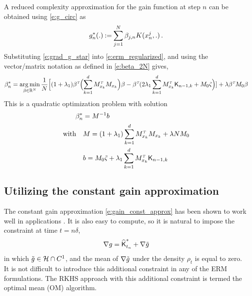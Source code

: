 A reduced complexity approximation for the gain function at step $n$ can be obtained using \eqref{e:g_circ} as
\begin{equation}
g^*_n(.)  \mathbin{:=} \sum_{j=1}^N \beta_{j,n} K(x^j_n, . ) \, .
\end{equation}
Substituting \eqref{e:grad_g_star} into \eqref{e:erm_regularized}, and using the vector/matrix notation as defined in \eqref{e:beta_2N} gives,
\begin{equation}
\beta ^*_n =
\mathop{\rm arg{\,}min}_{\beta  \in \mathbb{R}^N}  \frac{1}{N} \Bigl[ (1 + \lambda_1) \beta ^{\hbox{\tiny\it T}} \Bigl( \sum_{k=1}^d M_{x_k}^{\hbox{\tiny\it T}} M_{x_k} \Bigr) \beta  -  \beta ^{\hbox{\tiny\it T}}  ( 2 \lambda_1 \sum_{k=1}^d M_{x_k}^{\hbox{\tiny\it T}} \text{\sf K}_{n-1,k} +M_0 \tilde{\varsigma}  \Bigr) ] + \lambda \beta ^{\hbox{\tiny\it T}} M_0 \beta
\end{equation}
This is a quadratic optimization problem with solution
\begin{equation}
\begin{aligned}
\beta ^*_n  &= M^{-1} b
\\
\text{with} \quad
&
M =  (1+ \lambda_1)\sum_{k=1}^d M_{x_k}^\transpose M_{x_k} + \lambda N M_0
\\
&b =  M_0 \vectilc  + \lambda_1 \sum_{k =1}^d  M_{x_k}^\transpose \kFPF_{n-1,k}
\end{aligned}
\label{e:beta_n}
\end{equation}

\subsection{Utilizing the constant gain approximation}
\label{s:RKHS_OM}




The constant gain approximation \eqref{e:gain_const_approx} has been shown to work well in applications \cite{tilghiomeh13}. It is also easy to compute, so it is natural to impose the constraint at time $t=n\delta$,
\[
\nabla g =  \widehat{\text{\sf K}}^*_{t_n} +  \nabla \tilde g
\]
in which $\tilde g\in {\cal H} \cap C^1$,  and the mean of  $ \nabla \tilde g$ under the density $\rho_t$ is equal to zero.
It is not difficult to introduce this additional constraint in any of the ERM formulations.  The RKHS approach with this additional constraint is termed the optimal mean (OM) algorithm.


